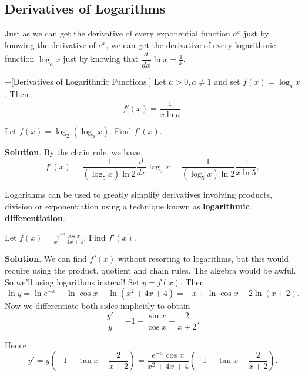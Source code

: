 \documentclass[10pt,]{book}
\newcommand{\terminology}[1]{\textbf{#1}}
\theoremstyle{ptxplainnotitle}
\theoremstyle{ptxplaintitle}
\theoremstyle{ptxplainnotitle}
\theoremstyle{ptxplaintitle}
\theoremstyle{ptxplainnotitle}
\theoremstyle{ptxplaintitle}
\theoremstyle{ptxdefinitionnotitle}
\theoremstyle{ptxdefinitiontitle}
\theoremstyle{ptxdefinitionnotitle}
\theoremstyle{ptxdefinitiontitle}
\theoremstyle{ptxdefinitionnotitle}
\theoremstyle{ptxdefinitiontitle}
\theoremstyle{ptxdefinitionnotitle}
\theoremstyle{ptxdefinitiontitle}
\theoremstyle{ptxdefinitionnotitle}
\theoremstyle{ptxdefinitiontitle}
\numberwithin{equation}{section}
\newcommand{\dv}[3][]{\dfrac{d^{#1} #2}{d #3^{#1}}}
\begin{document}
\subsection[{Derivatives of Logarithms}]{Derivatives of Logarithms}\label{subsection-derivatives-of-logarithms}
\hypertarget{p-235}{}%
Just as we can get the derivative of every exponential function \(a^{x}\) just by knowing the derivative of \(e^{x}\), we can get the derivative of every logarithmic function \(\log_{a}x\) just by knowing that \(\dv{}{x}\ln x = \frac{1}{x}\).%
\begin{theorem}+[{Derivatives of Logarithmic Functions.}]\label{theorem-derivatives-of-logarithmic-functions}
\hypertarget{p-236}{}%
Let \(a > 0, a\neq 1\) and set \(f(x) = \log_{a}x\). Then%
\begin{equation*}
f'(x) = \frac{1}{x\ln a}.
\end{equation*}
%
\end{theorem}
\begin{example}\label{example-differentiating-nested-logarithms}
\hypertarget{p-237}{}%
Let \(f(x) = \log_{2}(\log_{5} x)\). Find \(f'(x)\).%
\par\smallskip%
\noindent\textbf{Solution}.\hypertarget{solution-51}{}\quad%
\hypertarget{p-238}{}%
By the chain rule, we have%
\begin{equation*}
f'(x) = \frac{1}{(\log_{5}x)\ln 2}\dv{}{x}\log_{5}x = \frac{1}{(\log_{5} x)\ln 2}\frac{1}{x\ln 5},
\end{equation*}
%
\end{example}
\hypertarget{p-239}{}%
Logarithms can be used to greatly simplify derivatives involving products, division or exponentiation using a technique known as \terminology{logarithmic differentiation}.%
\begin{example}\label{example-a-simple-fraction}
\hypertarget{p-240}{}%
Let \(f(x) = \frac{e^{-x}\cos x}{x^{2} + 4x + 4}\). Find \(f'(x)\).%
\par\smallskip%
\noindent\textbf{Solution}.\hypertarget{solution-52}{}\quad%
\hypertarget{p-241}{}%
We can find \(f'(x)\) without resorting to logarithms, but this would require using the product, quotient and chain rules. The algebra would be awful. So we'll using logarithms instead! Set \(y = f(x)\). Then%
\begin{equation*}
\ln y = \ln e^{-x} + \ln\cos x - \ln (x^{2} + 4x + 4) = -x + \ln\cos x - 2\ln(x+2).
\end{equation*}
Now we differentiate both sides implicitly to obtain%
\begin{equation*}
\frac{y'}{y} = -1 - \frac{\sin x}{\cos x} - \frac{2}{x+2}.
\end{equation*}
%
\par
\hypertarget{p-242}{}%
Hence%
\begin{equation*}
y' = y\left(-1 - \tan x - \frac{2}{x+2}\right) = \frac{e^{-x}\cos x}{x^{2} + 4x + 4}\left(-1 - \tan x - \frac{2}{x+2}\right).
\end{equation*}
%
\end{example}
\end{document}
